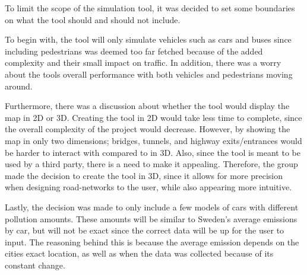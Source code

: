 
To limit the scope of the simulation tool, it was decided to set some boundaries on what the tool should and should not include. 

To begin with, the tool will only simulate vehicles such as cars and buses since including pedestrians was deemed too far fetched because of the added complexity and their small impact on traffic. In addition, there was a worry about the tools overall performance with both vehicles and pedestrians moving around.

Furthermore, there was a discussion about whether the tool would display the map in 2D or 3D. Creating the tool in 2D would take less time to complete, since the overall complexity of the project would decrease. However, by showing the map in only two dimensions; bridges, tunnels, and highway exits/entrances would be harder to interact with compared to in 3D. Also, since the tool is meant to be used by a third party, there is a need to make it appealing. Therefore, the group made the decision to create the tool in 3D, since it allows for more precision when designing road-networks to the user, while also appearing more intuitive.

Lastly, the decision was made to only include a few models of cars with different pollution amounts. These amounts will be similar to Sweden's average emissions by car, but will not be exact since the correct data will be up for the user to input. The reasoning behind this is because the average emission depends on the cities exact location, as well as when the data was collected because of its constant change.